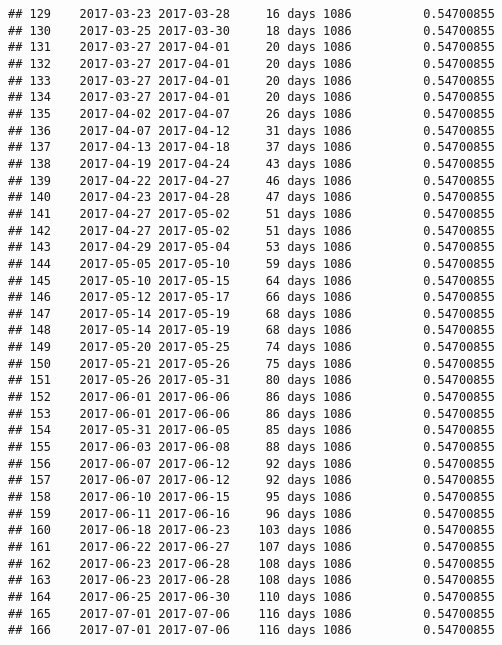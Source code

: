 \documentclass[]{article}
\begin{document}
\begin{verbatim}
## 129    2017-03-23 2017-03-28     16 days 1086          0.54700855
## 130    2017-03-25 2017-03-30     18 days 1086          0.54700855
## 131    2017-03-27 2017-04-01     20 days 1086          0.54700855
## 132    2017-03-27 2017-04-01     20 days 1086          0.54700855
## 133    2017-03-27 2017-04-01     20 days 1086          0.54700855
## 134    2017-03-27 2017-04-01     20 days 1086          0.54700855
## 135    2017-04-02 2017-04-07     26 days 1086          0.54700855
## 136    2017-04-07 2017-04-12     31 days 1086          0.54700855
## 137    2017-04-13 2017-04-18     37 days 1086          0.54700855
## 138    2017-04-19 2017-04-24     43 days 1086          0.54700855
## 139    2017-04-22 2017-04-27     46 days 1086          0.54700855
## 140    2017-04-23 2017-04-28     47 days 1086          0.54700855
## 141    2017-04-27 2017-05-02     51 days 1086          0.54700855
## 142    2017-04-27 2017-05-02     51 days 1086          0.54700855
## 143    2017-04-29 2017-05-04     53 days 1086          0.54700855
## 144    2017-05-05 2017-05-10     59 days 1086          0.54700855
## 145    2017-05-10 2017-05-15     64 days 1086          0.54700855
## 146    2017-05-12 2017-05-17     66 days 1086          0.54700855
## 147    2017-05-14 2017-05-19     68 days 1086          0.54700855
## 148    2017-05-14 2017-05-19     68 days 1086          0.54700855
## 149    2017-05-20 2017-05-25     74 days 1086          0.54700855
## 150    2017-05-21 2017-05-26     75 days 1086          0.54700855
## 151    2017-05-26 2017-05-31     80 days 1086          0.54700855
## 152    2017-06-01 2017-06-06     86 days 1086          0.54700855
## 153    2017-06-01 2017-06-06     86 days 1086          0.54700855
## 154    2017-05-31 2017-06-05     85 days 1086          0.54700855
## 155    2017-06-03 2017-06-08     88 days 1086          0.54700855
## 156    2017-06-07 2017-06-12     92 days 1086          0.54700855
## 157    2017-06-07 2017-06-12     92 days 1086          0.54700855
## 158    2017-06-10 2017-06-15     95 days 1086          0.54700855
## 159    2017-06-11 2017-06-16     96 days 1086          0.54700855
## 160    2017-06-18 2017-06-23    103 days 1086          0.54700855
## 161    2017-06-22 2017-06-27    107 days 1086          0.54700855
## 162    2017-06-23 2017-06-28    108 days 1086          0.54700855
## 163    2017-06-23 2017-06-28    108 days 1086          0.54700855
## 164    2017-06-25 2017-06-30    110 days 1086          0.54700855
## 165    2017-07-01 2017-07-06    116 days 1086          0.54700855
## 166    2017-07-01 2017-07-06    116 days 1086          0.54700855

\end{verbatim}
\end{document}
